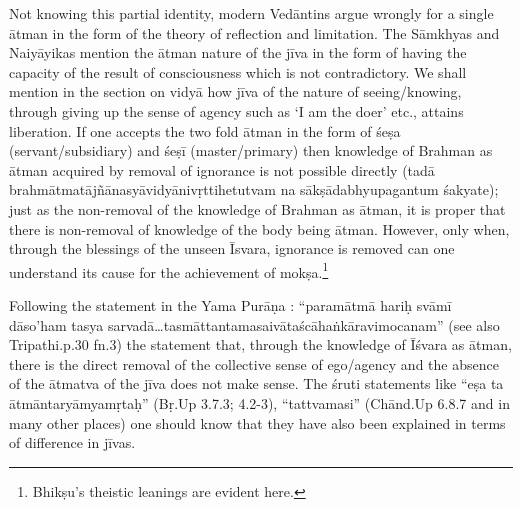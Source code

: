 Not knowing this partial identity, modern Vedāntins argue wrongly for a single ātman in the form of the theory of reflection and limitation. The Sāmkhyas and Naiyāyikas mention the ātman nature of the jīva in the form of having the capacity of the result of consciousness which is not contradictory. We shall mention in the section on vidyā how jīva of the nature of seeing/knowing, through giving up the sense of agency such as ‘I am the doer’ etc., attains liberation. If one accepts the two fold ātman in the form of śeṣa (servant/subsidiary) and śeṣī (master/primary) then knowledge of Brahman as ātman acquired by removal of ignorance is not possible directly (tadā brahmātmatājñānasyāvidyānivṛttihetutvam na sākṣādabhyupagantum śakyate); just as the non-removal of the knowledge of Brahman as ātman, it is proper that there is non-removal of knowledge of the body being ātman. However, only when, through the blessings of the unseen Īsvara, ignorance is removed can one understand its cause for the achievement of mokṣa.\footnote{Bhikṣu's theistic leanings are evident here.} 

Following the statement in the Yama Purāṇa : “paramātmā hariḥ svāmī dāso’ham tasya sarvadā…tasmāttantamasaivātaścāhaṅkāravimoca\-nam” (see also Tripathi.p.30 fn.3) the statement that, through the knowledge of Īśvara as ātman, there is the direct removal of the collective sense of ego/agency and the absence of the ātmatva of the jīva does not make sense. The śruti statements like “eṣa ta ātmāntaryāmyamṛtaḥ” (Bṛ.Up 3.7.3; 4.2-3), “tattvamasi” (Chānd.Up 6.8.7 and in many other places) one should know that they have also been explained in terms of difference in jīvas.



